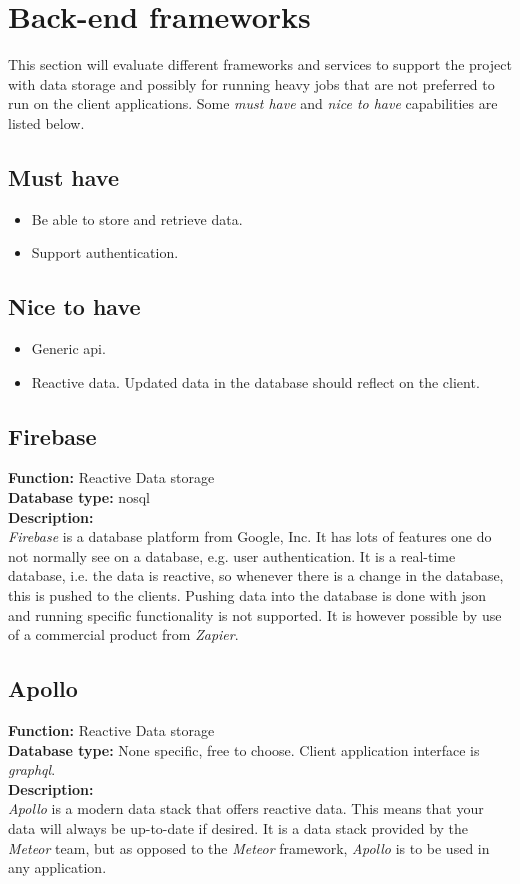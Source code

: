 \section{Back-end frameworks}
This section will evaluate different frameworks and services to support the project with data storage and possibly for running heavy jobs that are not preferred to run on the client applications.
Some \textit{must have} and \textit{nice to have} capabilities are listed below.
	
\subsection*{Must have}
	\begin{itemize}
	\item Be able to store and retrieve data.
	\item Support authentication.
	\end{itemize}
	
\subsection*{Nice to have}	
	\begin{itemize}
	\item Generic \gls{api}.
	\item Reactive data. Updated data in the database should reflect on the client.
	\end{itemize}
	

\subsection*{Firebase}
\textbf{Function:} Reactive Data storage
\\
\textbf{Database type:} \gls{nosql}
\\
\textbf{Description:}
\\
\textit{Firebase} is a database platform from Google, Inc. 
It has lots of features one do not normally see on a database, e.g. user authentication.
It is a real-time database, i.e. the data is reactive, so whenever there is a change in the database, this is pushed to the clients. 
Pushing data into the database is done with \gls{json} and running specific functionality is not supported.
It is however possible by use of a commercial product from  \textit{Zapier}.

\subsection*{Apollo}
\textbf{Function:} Reactive Data storage
\\
\textbf{Database type:} None specific, free to choose.
Client application interface is \textit{\gls{graphql}}.
\\
\textbf{Description:}
\\
\textit{Apollo} is a modern data stack that offers reactive data. 
This means that your data will always be up-to-date if desired.
It is a data stack provided by the \textit{Meteor} team, but as opposed to the \textit{Meteor} framework, \textit{Apollo} is to be used in any application. 

